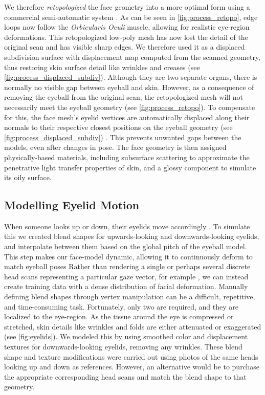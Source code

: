 We therefore \emph{retopologized} the face geometry into a more optimal form using a commercial semi-automatic system \cite{ZRemesher}.
As can be seen in \autoref{fig:process_retopo}, edge loops now follow the \emph{Orbicularis Oculi} muscle, allowing for realistic eye-region deformations.
This retopologized low-poly mesh has now lost the detail of the original scan and has visible sharp edges.
We therefore used it as a displaced subdivision surface \cite{lee2000displaced} with displacement map computed from the scanned geometry, thus restoring skin surface detail like wrinkles and creases (see \autoref{fig:process_displaced_subdiv}).
Although they are two separate organs, there is normally no visible gap between eyeball and skin.
However, as a consequence of removing the eyeball from the original scan, the retopologized mesh will not necessarily meet the eyeball geometry (see \autoref{fig:process_retopo}).
To compensate for this, the face mesh's eyelid vertices are automatically displaced along their normals to their respective closest positions on the eyeball geometry (see \autoref{fig:process_displaced_subdiv}) \cite{Shrinkwrap}.
This prevents unwanted gaps between the models, even after changes in pose.
The face geometry is then assigned physically-based materials, including subsurface scattering to approximate the penetrative light transfer properties of skin, and a glossy component to simulate its oily surface.


\subsection{Modelling Eyelid Motion}

When someone looks up or down, their eyelids move accordingly \cite{liversedge2011oxford}.
To simulate this we created blend shapes for upwards-looking and downwards-looking eyelids, and interpolate between them based on the global pitch of the eyeball model.
This step makes our face-model dynamic, allowing it to continuously deform to match eyeball poses
Rather than rendering a single or perhaps several discrete head scans representing a particular gaze vector, for example \cite{sugano2014learning}, we can instead create training data with a dense distribution of facial deformation.
Manually defining blend shapes through vertex manipulation can be a difficult, repetitive, and time-consuming task.
Fortunately, only two are required, and they are localized to the eye-region.
As the tissue around the eye is compressed or stretched, skin details like wrinkles and folds are either attenuated or exaggerated (see \autoref{fig:eyelids}).
We modeled this by using smoothed color and displacement textures for downwards-looking eyelids, removing any wrinkles.
These blend shape and texture modifications were carried out using photos of the same heads looking up and down as references.
However, an alternative would be to purchase the appropriate corresponding head scans and match the blend shape to that geometry.

